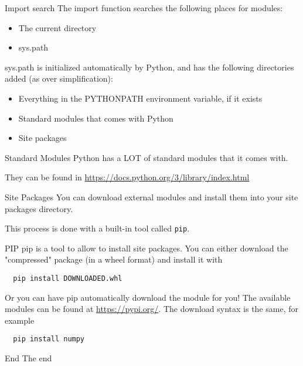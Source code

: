 \begin{frame}[containsverbatim]{Import search}
  The import function searches the following places for modules:
  \begin{itemize}
    \item The current directory
    \item sys.path
  \end{itemize}

  sys.path is initialized automatically by Python, and has the following directories added (as over simplification):
  \begin{itemize}
    \item Everything in the PYTHONPATH environment variable, if it exists
    \item Standard modules that comes with Python
    \item Site packages
  \end{itemize}
\end{frame}

\begin{frame}[containsverbatim]{Standard Modules}
  Python has a LOT of standard modules that it comes with.

  They can be found in \url{https://docs.python.org/3/library/index.html}
\end{frame}

\begin{frame}[containsverbatim]{Site Packages}
  You can download external modules and install them into your site packages directory.

  This process is done with a built-in tool called \verb|pip|.
\end{frame}

\begin{frame}[containsverbatim]{PIP}
  pip is a tool to allow to install site packages. You can either download the "compressed" package (in a wheel format) and install it with
  \begin{verbatim}
  pip install DOWNLOADED.whl
  \end{verbatim}

  Or you can have pip automatically download the module for you! The available modules can be found at \url{https://pypi.org/}. The download syntax is the same, for example
  \begin{verbatim}
  pip install numpy
  \end{verbatim}
\end{frame}


\begin{frame}[standout]{End}
  The end
\end{frame}


